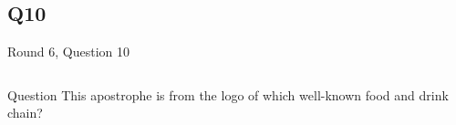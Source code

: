 \documentclass[11pt]{beamer}
\begin{document}
\subsection*{Q10}
\begin{frame}[t]{Round 6, Question 10}
\begin{columns}[T,totalwidth=\linewidth]
\begin{column}{0.32\linewidth}
\begin{block}{Question}
This apostrophe is from the logo of which well-known food and drink chain?
\end{block}
\end{column}
\begin{column}{0.65\linewidth}
\begin{center}
\texttt{[image: \{Images/ddicon]}.png}
\end{center}
\end{column}
\end{columns}
\end{frame}
\end{document}

